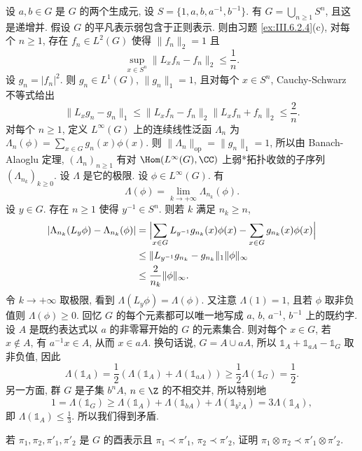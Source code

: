 \begin{solution}
设 $a, b \in G$ 是 $G$ 的两个生成元, 设 $S = \{1, a, b, a^{-1}, b^{-1}\}$. 有 $G = \bigcup_{n \geq 1}S^n$, 且这是递增并. 假设 $G$ 的平凡表示弱包含于正则表示. 则由习题 \ref{ex:III.6.2.4}(c), 对每个 $n \geq 1$, 存在 $f_n \in L^2(G)$ 使得 $\|f_n\|_2 = 1$ 且
\[
\sup_{x \in S^n}\|L_xf_n - f_n\|_2 \leq \frac{1}{n}.
\]
设 $g_n = |f_n|^2$. 则 $g_n \in L^1(G)$, $\|g_n\|_1 = 1$, 且对每个 $x \in S^n$, Cauchy-Schwarz 不等式给出
\[
\|L_xg_n - g_n\|_1 \leq \|L_xf_n - f_n\|_2\|L_xf_n + f_n\|_2 \leq \frac{2}{n}.
\]
对每个 $n \geq 1$, 定义 $L^{\infty}(G)$ 上的连续线性泛函 $\Lambda_n$ 为 $\Lambda_n(\phi) = \sum_{x \in G}g_n(x)\phi(x)$. 则 $\|\Lambda_n\|_{\mathrm{op}} = \|g_n\|_1 = 1$, 所以由 Banach-Alaoglu 定理, $(\Lambda_n)_{n \geq 1}$ 有对 $\Hom(L^{\infty}(G), \CC)$ 上弱*拓扑收敛的子序列 $(\Lambda_{n_k})_{k \geq 0}$. 设 $\Lambda$ 是它的极限. 设 $\phi \in L^{\infty}(G)$. 有
\[
\Lambda(\phi) = \lim_{k \to +\infty}\Lambda_{n_k}(\phi).
\]
设 $y \in G$. 存在 $n \geq 1$ 使得 $y^{-1} \in S^n$. 则若 $k$ 满足 $n_k \geq n$,
\begin{align*}
|\Lambda_{n_k}(L_y\phi) - \Lambda_{n_k}(\phi)| &= \Bigl|\sum_{x \in G}L_{y^{-1}}g_{n_k}(x)\phi(x) - \sum_{x \in G}g_{n_k}(x)\phi(x)\Bigr| \\
&\leq \|L_{y^{-1}}g_{n_k} - g_{n_k}\|_1\|\phi\|_{\infty} \\
&\leq \frac{2}{n_k}\|\phi\|_{\infty}.
\end{align*}
令 $k \to +\infty$ 取极限, 看到 $\Lambda(L_y\phi) = \Lambda(\phi)$. 又注意 $\Lambda(1) = 1$, 且若 $\phi$ 取非负值则 $\Lambda(\phi) \geq 0$.
回忆 $G$ 的每个元素都可以唯一地写成 $a$, $b$, $a^{-1}$, $b^{-1}$ 上的既约字. 设 $A$ 是既约表达式以 $a$ 的非零幂开始的 $G$ 的元素集合. 则对每个 $x \in G$, 若 $x \notin A$, 有 $a^{-1}x \in A$, 从而 $x \in aA$. 换句话说, $G = A \cup aA$, 所以 $\mathbb{1}_A + \mathbb{1}_{aA} - \mathbb{1}_G$ 取非负值, 因此
\[
\Lambda(\mathbb{1}_A) = \frac{1}{2}(\Lambda(\mathbb{1}_A) + \Lambda(\mathbb{1}_{aA})) \geq \frac{1}{2}\Lambda(\mathbb{1}_G) = \frac{1}{2}.
\]
另一方面, 群 $G$ 是子集 $b^nA$, $n \in \Z$ 的不相交并, 所以特别地
\[
1 = \Lambda(\mathbb{1}_G) \geq \Lambda(\mathbb{1}_A) + \Lambda(\mathbb{1}_{bA}) + \Lambda(\mathbb{1}_{b^2A}) = 3\Lambda(\mathbb{1}_A),
\]
即 $\Lambda(\mathbb{1}_A) \leq \frac{1}{3}$. 所以我们得到矛盾.
\end{solution}

\begin{exercise}[张量积与弱包含]
\label{ex:III.6.2.9}
若 $\pi_1, \pi_2, \pi'_1, \pi'_2$ 是 $G$ 的酉表示且 $\pi_1 \prec \pi'_1$, $\pi_2 \prec \pi'_2$, 证明 $\pi_1 \otimes \pi_2 \prec \pi'_1 \otimes \pi'_2$.
\end{exercise}

